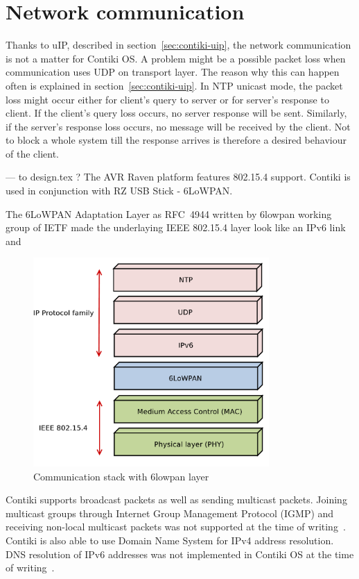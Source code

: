 
\section{Network communication}
Thanks to uIP, described in section~\ref{sec:contiki-uip},
the network communication is not a matter for Contiki OS.
A problem might be a possible packet loss when communication uses UDP on transport layer.
The reason why this can happen often is explained in section~\ref{sec:contiki-uip}.
In NTP unicast mode, the packet loss might occur either for client's query to server
or for server's response to client.
If the client's query loss occurs, no server response will be sent.
Similarly, if the server's response loss occurs, no message will be received by the client.
Not to block a whole system till the response arrives
is therefore a desired behaviour of the client.

--- to design.tex ?
The AVR Raven platform features 802.15.4 support.
Contiki is used in conjunction with RZ USB Stick - 6LoWPAN.

The 6LoWPAN Adaptation Layer %
as RFC~4944 written by 6lowpan working group of IETF
made the underlaying IEEE 802.15.4 layer
look like an IPv6 link~\cite{6lowpan} and
\begin{figure}
  \centering
  \includegraphics[width=9cm,keepaspectratio]{fig/6lowpan.pdf}
  \caption{Communication stack with 6lowpan layer}
  \label{fig:design-6lowpan}
  \bigskip
\end{figure}


Contiki supports broadcast packets as well as sending multicast packets.
Joining multicast groups through Internet Group Management Protocol (IGMP)
and receiving non-local multicast packets
was not supported at the time of writing~\cite{contiki-docs}.
Contiki is also able to use Domain Name System for IPv4 address resolution.
DNS resolution of IPv6 addresses was not implemented in Contiki OS
at the time of writing~\cite{contiki-docs}.
